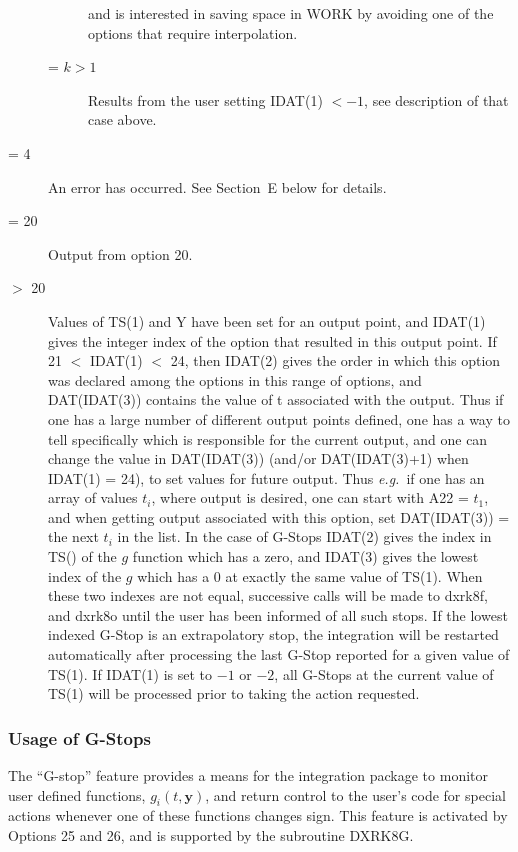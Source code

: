 \documentclass[twoside]{MATH77}
\begin{document}
\begin{description}
\begin{description}
  and is interested in saving space in WORK by avoiding one of the
  options that require interpolation.
\item[= $k > 1$]  Results from the user setting IDAT(1) $< -1$, see
  description of that case above.
\end{description}
\item[= 4]  An error has occurred.  See Section~E below for details.
\item[= 20] Output from option 20.
\item[$>$ 20] Values of TS(1) and Y have been set for an output point,
  and IDAT(1) gives the integer index of the option that resulted in
  this output point.  If 21 $<$ IDAT(1) $<$ 24, then IDAT(2) gives the
  order in which this option was declared among the options in this
  range of options, and DAT(IDAT(3)) contains the value of t
  associated with the output.  Thus if one has a large number of
  different output points defined, one has a way to tell specifically
  which is responsible for the current output, and one can change the
  value in DAT(IDAT(3)) (and/or DAT(IDAT(3)+1) when IDAT(1) = 24), to
  set values for future output.  Thus {\em e.g.}\ if one has an array
  of values $t_i$, where output is desired, one can start with A22 =
  $t_1$, and when getting output associated with this option, set
  DAT(IDAT(3)) = the next $t_i$ in the list.  In the case of G-Stops
  IDAT(2) gives the index in TS() of the $g$ function which has a
  zero, and IDAT(3) gives the lowest index of the $g$ which has a 0 at
  exactly the same value of TS(1).  When these two indexes are not
  equal, successive calls will be made to dxrk8f, and dxrk8o until the
  user has been informed of all such stops.  If the lowest indexed
  G-Stop is an extrapolatory stop, the integration will be restarted
  automatically after processing the last G-Stop reported for a given
  value of TS(1).  If IDAT(1) is set to $-1$ or $-2$, all G-Stops at
  the current value of TS(1) will be processed prior to taking the
  action requested.

\end{description}

\subsubsection{Usage of G-Stops\label{GStops}}

The ``G-stop'' feature provides a means for the integration package to
monitor user defined functions, $g_i(t,{\mathbf y})$, and return
control to the user's code for special actions whenever one of these
functions changes sign. This feature is activated by Options 25 and
26, and is supported by the subroutine DXRK8G.
\end{document}
